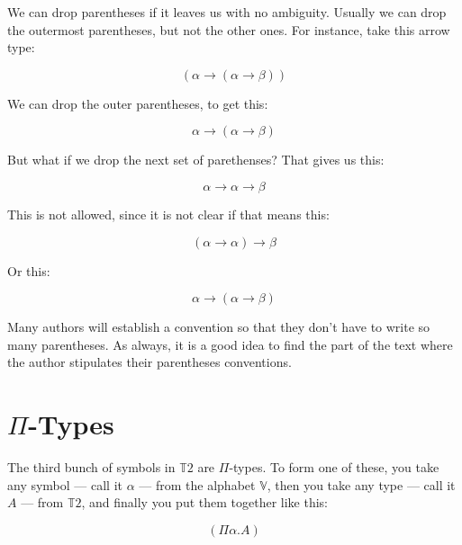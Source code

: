 \documentclass{book}
\numberwithin{equation}{chapter}
\begin{document}
\noindent
We can drop parentheses if it leaves us with no ambiguity. Usually we can drop the outermost parentheses, but not the other ones. For instance, take this arrow type:

\begin{equation}
(\alpha \rightarrow (\alpha \rightarrow \beta))
\end{equation}

\noindent
We can drop the outer parentheses, to get this:

\begin{equation}
\alpha \rightarrow (\alpha \rightarrow \beta)
\end{equation}

\noindent
But what if we drop the next set of parethenses? That gives us this:

\begin{equation}
\alpha \rightarrow \alpha \rightarrow \beta
\end{equation}

\noindent
This is not allowed, since it is not clear if that means this:

\begin{equation}
(\alpha \rightarrow \alpha) \rightarrow \beta
\end{equation}

\noindent
Or this:

\begin{equation}
\alpha \rightarrow (\alpha \rightarrow \beta)
\end{equation}

\noindent
Many authors will establish a convention so that they don't have to write so many parentheses. As always, it is a good idea to find the part of the text where the author stipulates their parentheses conventions.


\section{$\Pi$-Types}

The third bunch of symbols in $\mathbb{T}2$ are $\Pi$-types. To form one of these, you take any symbol --- call it $\alpha$ --- from the alphabet $\mathbb{V}$, then you take any type --- call it $A$ --- from $\mathbb{T}2$, and finally you put them together like this:

\begin{equation}
(\Pi \alpha.A)
\end{equation}
\end{document}
